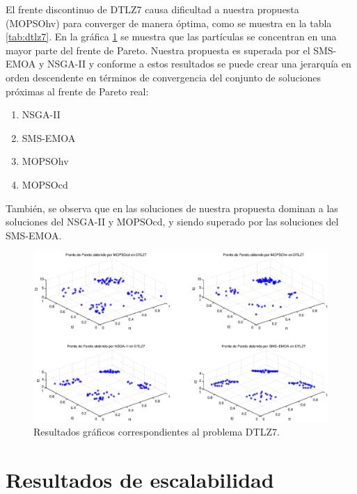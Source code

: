 El frente discontinuo de DTLZ7 causa dificultad a nuestra propuesta (MOPSOhv) para converger de manera \'optima, como se muestra en la 
tabla \ref{tab:dtlz7}. En la gr\'afica \ref{fig:rDTLZ7} se muestra que las part\'iculas se concentran en una mayor parte del 
frente de Pareto. Nuestra propuesta es superada por el SMS-EMOA y NSGA-II y conforme a estos resultados se puede crear una
jerarqu\'ia en orden descendente en t\'erminos de convergencia del conjunto de soluciones pr\'oximas al frente de Pareto real:

\begin{enumerate}
  \item NSGA-II
  \item SMS-EMOA
  \item MOPSOhv
  \item MOPSOcd
\end{enumerate}

Tambi\'en, se observa que en las soluciones de nuestra propuesta dominan a las soluciones del NSGA-II y MOPSOcd, y siendo superado por las 
soluciones del SMS-EMOA.
  
  \clearpage

\newpage

\begin{figure}
      \begin{center}
	  \includegraphics[scale=0.45]{Cap4/rdtlz7r.eps}
      \end{center}
	\caption{Resultados gr\'aficos correspondientes al problema DTLZ7.}
      \label{fig:rDTLZ7}
      \end{figure}
\clearpage


\section{Resultados de escalabilidad}

